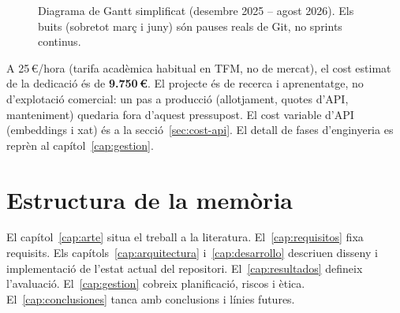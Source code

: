 \begin{figure}[htbp]
\centering

\caption{Diagrama de Gantt simplificat (desembre 2025 -- agost 2026). Els buits (sobretot març i juny) són pauses reals de Git, no sprints continus.}
\label{fig:gantt}
\end{figure}

A 25\,€/hora (tarifa acadèmica habitual en TFM, no de mercat), el cost estimat de la dedicació és de \textbf{9.750\,€}. El projecte és de recerca i aprenentatge, no d'explotació comercial: un pas a producció (allotjament, quotes d'API, manteniment) quedaria fora d'aquest pressupost. El cost variable d'API (embeddings i xat) és a la secció~\ref{sec:cost-api}. El detall de fases d'enginyeria es reprèn al capítol~\ref{cap:gestion}.

\section{Estructura de la memòria}

El capítol~\ref{cap:arte} situa el treball a la literatura. El~\ref{cap:requisitos} fixa requisits. Els capítols~\ref{cap:arquitectura} i~\ref{cap:desarrollo} descriuen disseny i implementació de l'estat actual del repositori. El~\ref{cap:resultados} defineix l'avaluació. El~\ref{cap:gestion} cobreix planificació, riscos i ètica. El~\ref{cap:conclusiones} tanca amb conclusions i línies futures.

